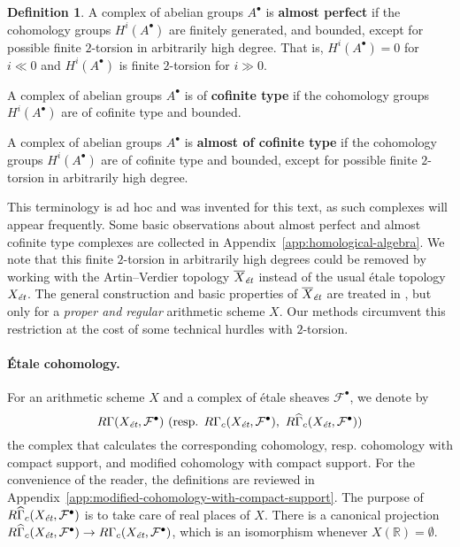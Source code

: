 \documentclass[leqno,12pt]{article}
\theoremstyle{plain}
\theoremstyle{definition}
\newtheorem{definition}[theorem]{\indent\sc Definition}
\newcommand{\RR}{\mathbb{R}}
\newcommand{\et}{\text{\it \'{e}t}}
\begin{document}
\begin{definition}
  \label{dfn:almost-of-(co)finite-type}
  A complex of abelian groups $A^\bullet$ is \textbf{almost perfect}
  if the cohomology groups $H^i (A^\bullet)$ are finitely generated, and
  bounded, except for possible finite $2$-torsion in arbitrarily high degree.
  That is, $H^i (A^\bullet) = 0$ for $i \ll 0$ and $H^i (A^\bullet)$ is finite
  $2$-torsion for $i \gg 0$.

  A complex of abelian groups $A^\bullet$ is of \textbf{cofinite type} if the
  cohomology groups $H^i (A^\bullet)$ are of cofinite type and bounded.

  A complex of abelian groups $A^\bullet$ is \textbf{almost of cofinite type}
  if the cohomology groups $H^i (A^\bullet)$ are of cofinite type and
  bounded, except for possible finite $2$-torsion in arbitrarily high
  degree.
\end{definition}

This terminology is ad hoc and was invented for this text, as such complexes
will appear frequently. Some basic observations about almost perfect and almost
cofinite type complexes are collected in
Appendix~\ref{app:homological-algebra}. We note that this finite $2$-torsion in
arbitrarily high degrees could be removed by working with the Artin--Verdier
topology $\overline{X}_\et$ instead of the usual \'{e}tale topology $X_\et$.
The general construction and basic properties of $\overline{X}_\et$ are treated
in \cite[Appendix~A]{Flach-Morin-2018}, but only for a \emph{proper and regular}
arithmetic scheme $X$. Our methods circumvent this restriction at the cost of
some technical hurdles with $2$-torsion.

\paragraph{\'{E}tale cohomology.}
For an arithmetic scheme $X$ and a complex of \'{e}tale sheaves
$\mathcal{F}^\bullet$, we denote by
\[ R\Gamma (X_\et, \mathcal{F}^\bullet) ~
\text{(resp. }R\Gamma_c (X_\et, \mathcal{F}^\bullet), ~
R\widehat{\Gamma}_c (X_\et, \mathcal{F}^\bullet)\text{)} \]
the complex that calculates the corresponding cohomology, resp. cohomology with
compact support, and modified cohomology with compact support.
For the convenience of the reader, the definitions are reviewed in
Appendix~\ref{app:modified-cohomology-with-compact-support}. The purpose of
$R\widehat{\Gamma}_c (X_\et, \mathcal{F}^\bullet)$ is to take care of real
places of $X$. There is a canonical projection
$R\widehat{\Gamma}_c (X_\et, \mathcal{F}^\bullet) \to R\Gamma_c (X_\et,
\mathcal{F}^\bullet)$, which is an isomorphism whenever $X (\RR) = \emptyset$.
\end{document}
